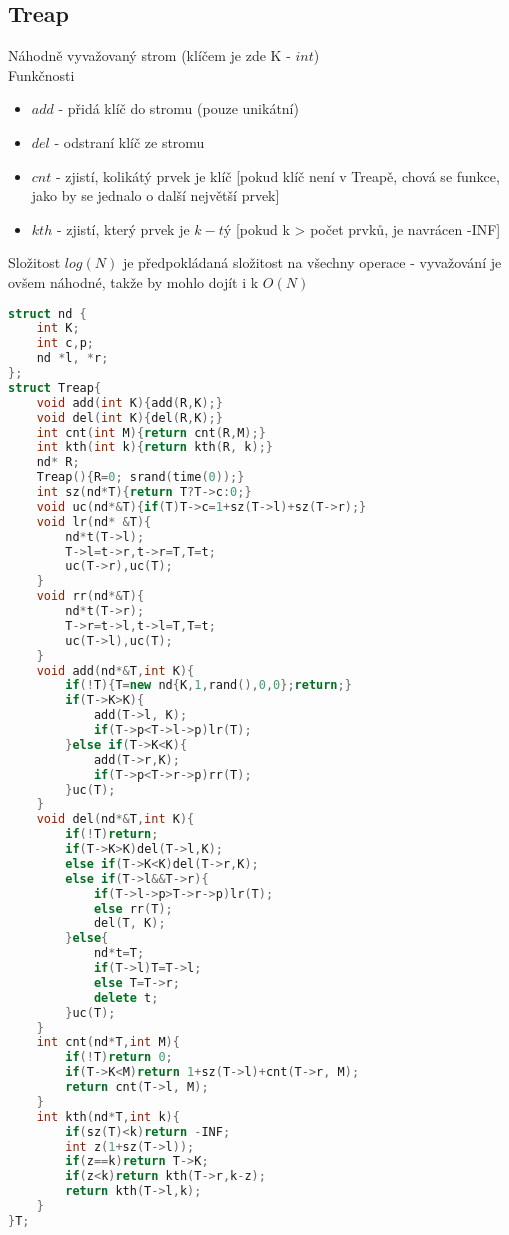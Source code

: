 \documentclass[11pt]{article}
\begin{document}
\subsection{Treap}
Náhodně vyvažovaný strom (klíčem je zde \textsf{K} - $int$)
\\Funkčnosti
\begin{itemize}
\item $add$ - přidá klíč do stromu (pouze unikátní)
\item $del$ - odstraní klíč ze stromu
\item $cnt$ - zjistí, kolikátý prvek je klíč [pokud klíč není v Treapě, chová se funkce, jako by se jednalo o další největší prvek]
\item $kth$ - zjistí, který prvek je $k-tý$ [pokud k > počet prvků, je navrácen -INF]
\end{itemize}
Složitost $log(N)$ je předpokládaná složitost na všechny operace - vyvažování je ovšem náhodné, takže by mohlo dojít i k $O(N)$
\begin{lstlisting}[language=C++]
struct nd {
    int K;
    int c,p;
    nd *l, *r;
};
struct Treap{
    void add(int K){add(R,K);}
    void del(int K){del(R,K);}
    int cnt(int M){return cnt(R,M);}
    int kth(int k){return kth(R, k);}
    nd* R;
    Treap(){R=0; srand(time(0));}
    int sz(nd*T){return T?T->c:0;}
    void uc(nd*&T){if(T)T->c=1+sz(T->l)+sz(T->r);}
    void lr(nd* &T){
        nd*t(T->l);
        T->l=t->r,t->r=T,T=t;
        uc(T->r),uc(T);
    }
    void rr(nd*&T){
        nd*t(T->r);
        T->r=t->l,t->l=T,T=t;
        uc(T->l),uc(T);
    }
    void add(nd*&T,int K){
        if(!T){T=new nd{K,1,rand(),0,0};return;}
        if(T->K>K){
            add(T->l, K);
            if(T->p<T->l->p)lr(T);
        }else if(T->K<K){
            add(T->r,K);
            if(T->p<T->r->p)rr(T);
        }uc(T);
    }
    void del(nd*&T,int K){
        if(!T)return;
        if(T->K>K)del(T->l,K);
        else if(T->K<K)del(T->r,K);
        else if(T->l&&T->r){
            if(T->l->p>T->r->p)lr(T);
            else rr(T);
            del(T, K);
        }else{
            nd*t=T;
            if(T->l)T=T->l;
            else T=T->r;
            delete t;
        }uc(T);
    }
    int cnt(nd*T,int M){
        if(!T)return 0;
        if(T->K<M)return 1+sz(T->l)+cnt(T->r, M);
        return cnt(T->l, M);
    }
    int kth(nd*T,int k){
        if(sz(T)<k)return -INF;
        int z(1+sz(T->l));
        if(z==k)return T->K;
        if(z<k)return kth(T->r,k-z);
        return kth(T->l,k);
    }
}T;
\end{lstlisting}
\end{document}
